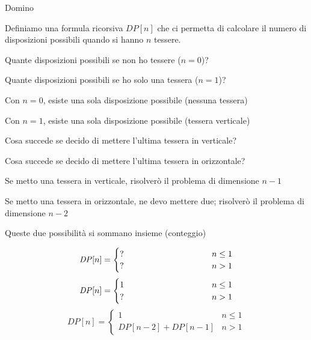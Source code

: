 \begin{frame}{Domino}

\vspace{-9pt}
\begin{myboxtitle}
Definiamo una formula ricorsiva $\mathit{DP}[n]$ che ci permetta di calcolare il numero di disposizioni possibili quando si hanno $n$ tessere.
\end{myboxtitle}

\begin{overprint}
\BIL
\item Quante disposizioni possibili se non ho tessere ($n=0$)?
\item Quante disposizioni possibili se ho solo una tessera ($n=1$)?
\EIL
{}
\BIL
\item Con $n=0$, esiste una sola disposizione possibile (nessuna tessera)
\item Con $n=1$, esiste una sola disposizione possibile (tessera verticale)
\EIL
{}
\BIL
\item Cosa succede se decido di mettere l'ultima tessera in verticale?
\item Cosa succede se decido di mettere l'ultima tessera in orizzontale?
\EI
{}
\BIL
\item Se metto una tessera in verticale, risolverò il problema
di dimensione $n-1$
\item Se metto una tessera in orizzontale, ne devo mettere due; risolverò
il problema di dimensione $n-2$
\item Queste due possibilità si sommano insieme (conteggio)
\EIL
\end{overprint}

\bigskip
\begin{overprint}
\[
\mathit{DP}[n] = \begin{cases}
  ? & n \leq 1 \\
  \makebox[3.5cm][l]{?} & n>1
\end{cases}
\]
\[
\mathit{DP}[n] = \begin{cases}
  1 & n \leq 1 \\
  \makebox[3.5cm][l]{?} & n>1
\end{cases}
\]
\[
\mathit{DP}[n] = \begin{cases}
  1 & n \leq 1 \\
  \mathit{DP}[n-2]+\mathit{DP}[n-1] & n>1
\end{cases}
\]
\end{overprint}

\end{frame}

